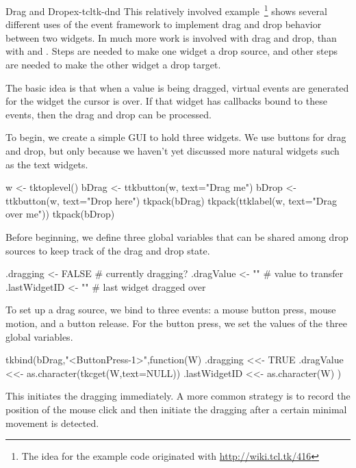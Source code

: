 \begin{example}{Drag and Drop}{ex-tcltk-dnd}
This relatively involved example~\footnote{The idea for the example
  code originated with \url{http://wiki.tcl.tk/416}} shows several
different uses of the event framework to implement drag and drop
behavior between two widgets. In  much more work is
involved with drag and drop, than with  and . Steps are needed to
make one widget a drop source, and other steps are needed to make the
other widget a drop target.

The basic idea is that when a value is being dragged, virtual events
are generated for the widget the cursor is over. If that widget has
callbacks bound to these events, then the drag and drop can be
processed.


To begin, we create a simple GUI to hold three widgets. We use buttons
for drag and drop, but only because we haven't yet discussed more
natural widgets such as the text widgets. 

\begin{Schunk}
\begin{Sinput}
 w <- tktoplevel()
 bDrag <- ttkbutton(w, text="Drag me")
 bDrop <- ttkbutton(w, text="Drop here")
 tkpack(bDrag)
 tkpack(ttklabel(w, text="Drag over me"))
 tkpack(bDrop)
\end{Sinput}
\end{Schunk}


Before beginning, we define three global variables that can be shared
among drop sources to keep track of the drag and drop state. 
\begin{Schunk}
\begin{Sinput}
 .dragging <- FALSE                 # currently dragging?
 .dragValue <- ""                   # value to transfer
 .lastWidgetID <- ""                # last widget dragged over
\end{Sinput}
\end{Schunk}
%
%
To set up a drag source, we bind to three events: a mouse button
press, mouse motion, and a button release. For the button press, we
set the values of the three global variables.
\begin{Schunk}
\begin{Sinput}
 tkbind(bDrag,"<ButtonPress-1>",function(W) {
   .dragging <<-  TRUE
   .dragValue <<- as.character(tkcget(W,text=NULL))
   .lastWidgetID <<- as.character(W)
 })
\end{Sinput}
\end{Schunk}
%
This initiates the dragging immediately. A more common strategy is to
record the position of the mouse click and then initiate the dragging
after a certain minimal movement is detected.


\end{example}
